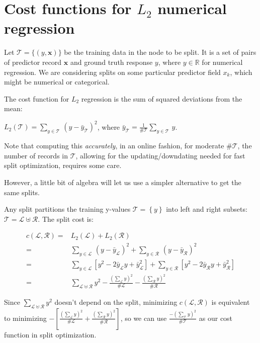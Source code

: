 \documentclass[10pt,openany]{article}
\numberwithin{definition}{section}
\numberwithin{example}{section}
\numberwithin{equation}{section}
\numberwithin{figure}{section}
\begin{document}
\section{\label{sec:numerical}Cost functions for $L_2$ numerical
regression}

Let $\mathcal{T} = \{ \left( y,\mathbf{x} \right) \}$ be the
training data in the node to be split.
It is a set of pairs of predictor record $\mathbf{x}$ and 
ground truth response $y$, where $y\in\mathbb{R}$ for numerical 
regression. We are considering splits on some particular 
predictor field $x_k$, which might be numerical or categorical.

The cost function for $L_2$ regression is the sum of squared 
deviations from the mean: 

$L_{2}\left(\mathcal{T}\right)
= \sum_{y\in\mathcal{T}}\,
\left(y-\bar{y}_{\mathcal{T}}\right)^{2}$,
where $\bar{y}_{\mathcal{T}}
= \frac{1}{\#\mathcal{T}}\sum_{y\in\mathcal{T}}\,y$.

Note that computing this \textit{accurately}, 
in an online fashion, for
moderate $\#\mathcal{T}$, the number of records in $\mathcal{T}$, 
allowing for
the updating/downdating needed for fast split optimization, 
requires some care. 

However, a little bit of algebra will let us use a simpler 
alternative to get the same splits. 


Any split partitions the training y-values
$\mathcal{T=}\left\{ y\right\} $ into left and right subsets: 
$\mathcal{T}=\mathcal{L}\uplus\mathcal{R}$.
The split cost is:

\begin{align*}
c\left(\mathcal{L},\mathcal{R}\right)= & 
L_{2}\left(\mathcal{L}\right)
+ L_{2}\left(\mathcal{R}\right)\\
= & \sum_{y\in\mathcal{L}}\,
\left(y-\bar{y}_{\mathcal{L}}\right)^{2}
+
\sum_{y\in\mathcal{R}}\,\left(y-\bar{y}_{\mathcal{R}}\right)^{2}\\
= & \sum_{y\in\mathcal{L}}\left[y^{2}-2\bar{y}_{\mathcal{L}}y
+
\bar{y}_{\mathcal{L}}^{2}\right]
+
\sum_{y\in\mathcal{R}}\left[y^{2}-2\bar{y}_{\mathcal{R}}y
+
\bar{y}_{\mathcal{R}}^{2}\right]\\
= & \sum_{\mathcal{L}\uplus\mathcal{R}}y^{2}
-
\frac{\left(\sum_{\mathcal{L}}y\right)^{2}}{\#\mathcal{L}}
-
\frac{\left(\sum_{\mathcal{R}}y\right)^{2}}{\#\mathcal{R}}
\end{align*}

Since $\sum_{\mathcal{L}\uplus\mathcal{R}}y^{2}$ doesn't 
depend on the split, minimizing 
$c\left(\mathcal{L},\mathcal{R}\right)$ is
equivalent to minimizing 
$-\left[\frac{\left(\sum_{\mathcal{L}}y\right)^{2}}{\#\mathcal{L}}
+
\frac{\left(\sum_{\mathcal{R}}y\right)^{2}}{\#\mathcal{R}}\right]$, 
so we can use 
$\frac{-\left(\sum_{\mathcal{T}}y\right)^{2}}{\#\mathcal{T}}$
as our cost function in split optimization.
\end{document}
